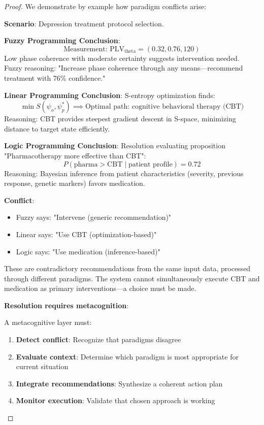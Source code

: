 \begin{proof}
We demonstrate by example how paradigm conflicts arise:

\textbf{Scenario}: Depression treatment protocol selection.

\textbf{Fuzzy Programming Conclusion}:
\begin{equation}
\text{Measurement: } \text{PLV}_{\text{theta}} = (0.32, 0.76, 120)
\end{equation}
Low phase coherence with moderate certainty suggests intervention needed. Fuzzy reasoning: "Increase phase coherence through any means—recommend treatment with 76\% confidence."

\textbf{Linear Programming Conclusion}:
S-entropy optimization finds:
\begin{equation}
\min S(\psi_o, \psi_p^*) \implies \text{Optimal path: cognitive behavioral therapy (CBT)}
\end{equation}
Reasoning: CBT provides steepest gradient descent in S-space, minimizing distance to target state efficiently.

\textbf{Logic Programming Conclusion}:
Resolution evaluating proposition "Pharmacotherapy more effective than CBT":
\begin{equation}
P(\text{pharma} > \text{CBT} \mid \text{patient profile}) = 0.72
\end{equation}
Reasoning: Bayesian inference from patient characteristics (severity, previous response, genetic markers) favors medication.

\textbf{Conflict}:
\begin{itemize}
\item Fuzzy says: "Intervene (generic recommendation)"
\item Linear says: "Use CBT (optimization-based)"
\item Logic says: "Use medication (inference-based)"
\end{itemize}

These are contradictory recommendations from the same input data, processed through different paradigms. The system cannot simultaneously execute CBT and medication as primary interventions—a choice must be made.

\textbf{Resolution requires metacognition}:

A metacognitive layer must:
\begin{enumerate}
\item \textbf{Detect conflict}: Recognize that paradigms disagree
\item \textbf{Evaluate context}: Determine which paradigm is most appropriate for current situation
\item \textbf{Integrate recommendations}: Synthesize a coherent action plan
\item \textbf{Monitor execution}: Validate that chosen approach is working
\end{enumerate}


\end{proof}
